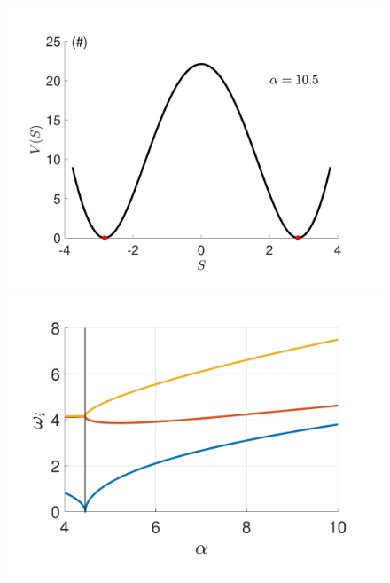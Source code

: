 \documentclass[prl,twocolumn,showpacs,preprintnumbers,amsmath,amssymb, superscriptaddress]{revtex4-2}
\newcommand{\1}{{1\hspace*{-0.5ex} \textrm{l} \hspace*{0.5ex}}}
\begin{document}
	\begin{figure}[tbh!]
		\begin{center}
			\includegraphics[width=0.9\columnwidth]{SupMatFig_EffectivePotential.pdf}
			\includegraphics[width=0.9\columnwidth]{SupMatFig_Freqs.pdf}
			\caption{  }
			\label{fig:gap}
		\end{center}
	\end{figure}


\end{document}
